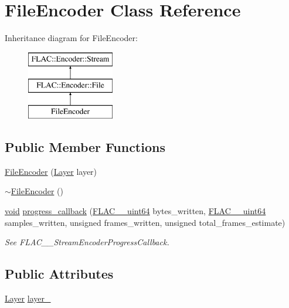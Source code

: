 \hypertarget{class_file_encoder}{}\section{File\+Encoder Class Reference}
\label{class_file_encoder}
Inheritance diagram for File\+Encoder\+:\begin{figure}[H]
\begin{center}
\leavevmode
\includegraphics[height=3.000000cm]{class_file_encoder}
\end{center}
\end{figure}
\subsection*{Public Member Functions}
\begin{DoxyCompactItemize}
\item 
\hyperlink{class_file_encoder_ac2df92224b9589a197202cc1ccd5cdf5}{File\+Encoder} (\hyperlink{decoders_8c_a9a8118be7780e95363d631cbca7e7800}{Layer} layer)
\item 
\hyperlink{class_file_encoder_a76d4cd94e2d10b091c57a4a52689ff3d}{$\sim$\+File\+Encoder} ()
\item 
\hyperlink{sound_8c_ae35f5844602719cf66324f4de2a658b3}{void} \hyperlink{class_file_encoder_ae625ef30ed3b185f986507424c547c8f}{progress\+\_\+callback} (\hyperlink{ordinals_8h_aa78c8c70a3eb8a58af7436f278acde8e}{F\+L\+A\+C\+\_\+\+\_\+uint64} bytes\+\_\+written, \hyperlink{ordinals_8h_aa78c8c70a3eb8a58af7436f278acde8e}{F\+L\+A\+C\+\_\+\+\_\+uint64} samples\+\_\+written, unsigned frames\+\_\+written, unsigned total\+\_\+frames\+\_\+estimate)
\begin{DoxyCompactList}\small\item\em See F\+L\+A\+C\+\_\+\+\_\+\+Stream\+Encoder\+Progress\+Callback. \end{DoxyCompactList}\end{DoxyCompactItemize}
\subsection*{Public Attributes}
\begin{DoxyCompactItemize}
\item 
\hyperlink{decoders_8c_a9a8118be7780e95363d631cbca7e7800}{Layer} \hyperlink{class_file_encoder_ab467ba85a87203d856af1def53102df3}{layer\+\_\+}
\end{DoxyCompactItemize}
